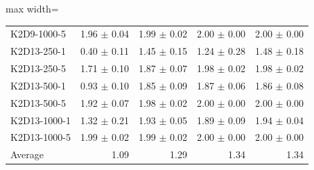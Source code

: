 \documentclass{article}
\begin{document}
\begin{table}[ht]
\begin{center}
\begin{small}
\begin{adjustbox}{max width=\columnwidth}
\begin{tabular}{l|rrrr}
K2D9-1000-5 & 1.96 $\pm$ 0.04 & 1.99 $\pm$ 0.02 & 2.00 $\pm$ 0.00 & 2.00 $\pm$ 0.00\\
K2D13-250-1 & 0.40 $\pm$ 0.11 & 1.45 $\pm$ 0.15 & 1.24 $\pm$ 0.28 & 1.48 $\pm$ 0.18\\
K2D13-250-5 & 1.71 $\pm$ 0.10 & 1.87 $\pm$ 0.07 & 1.98 $\pm$ 0.02 & 1.98 $\pm$ 0.02\\
K2D13-500-1 & 0.93 $\pm$ 0.10 & 1.85 $\pm$ 0.09 & 1.87 $\pm$ 0.06 & 1.86 $\pm$ 0.08\\
K2D13-500-5 & 1.92 $\pm$ 0.07 & 1.98 $\pm$ 0.02 & 2.00 $\pm$ 0.00 & 2.00 $\pm$ 0.00\\
K2D13-1000-1 & 1.32 $\pm$ 0.21 & 1.93 $\pm$ 0.05 & 1.89 $\pm$ 0.09 & 1.94 $\pm$ 0.04\\
K2D13-1000-5 & 1.99 $\pm$ 0.02 & 1.99 $\pm$ 0.02 & 2.00 $\pm$ 0.00 & 2.00 $\pm$ 0.00\\
\midrule
Average & 1.09 & 1.29 & 1.34 & 1.34\\
\end{tabular}
        \end{adjustbox}
    \end{small}
    \end{center}
    \vskip -0.1in
\end{table}
\FloatBarrier
\end{document}
